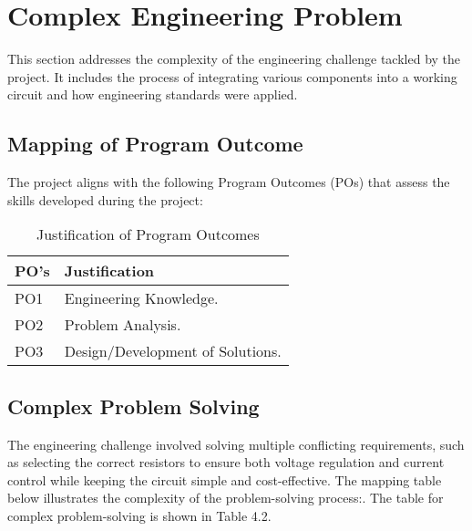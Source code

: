  

\section{Complex Engineering Problem}

This section addresses the complexity of the engineering challenge tackled by the project. It includes the process of integrating various components into a working circuit and how engineering standards were applied.

\subsection{Mapping of Program Outcome} 

The project aligns with the following Program Outcomes (POs) that assess the skills developed during the project:

\begin{center}
    \begin{table}[ht]
        \centering
        \caption{Justification of Program Outcomes}
        \begin{tabular}{|p{}|p{}|}
            \hline
            \textbf{PO's} & \textbf{Justification} \\
            \hline
            PO1 & Engineering Knowledge.  \\
            \hline
            PO2 & Problem Analysis. \\
            \hline
            PO3 & Design/Development of Solutions. \\
            \hline
        \end{tabular}
        \label{tab:po_justification}
    \end{table}
\end{center}



\subsection{Complex Problem Solving} 

The engineering challenge involved solving multiple conflicting requirements, such as selecting the correct resistors to ensure both voltage regulation and current control while keeping the circuit simple and cost-effective. The mapping table below illustrates the complexity of the problem-solving process:\cite{b20}. The table for complex problem-solving is shown in Table 4.2. 

